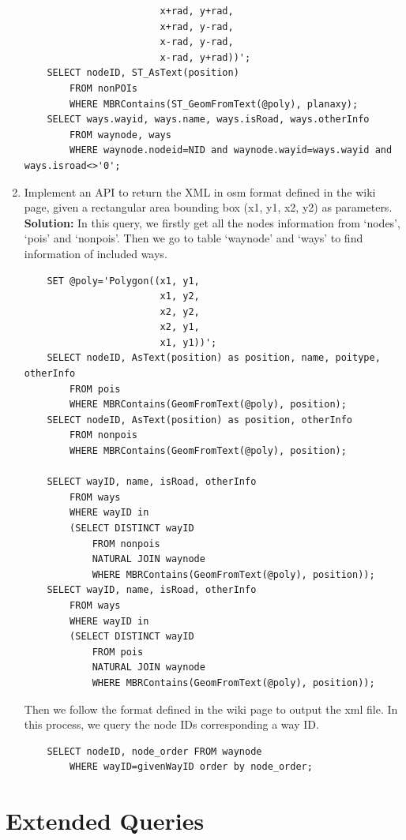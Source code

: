 \documentclass[final,1p,times]{elsarticle}
\begin{document}
\begin{enumerate}
\begin{verbatim}
                        x+rad, y+rad, 
                        x+rad, y-rad, 
                        x-rad, y-rad, 
                        x-rad, y+rad))';
    SELECT nodeID, ST_AsText(position)
        FROM nonPOIs
        WHERE MBRContains(ST_GeomFromText(@poly), planaxy);
    SELECT ways.wayid, ways.name, ways.isRoad, ways.otherInfo
        FROM waynode, ways
        WHERE waynode.nodeid=NID and waynode.wayid=ways.wayid and ways.isroad<>'0';
  \end{verbatim}
  \item Implement an API to return the XML in osm format defined in the wiki page, given a rectangular area bounding box (x1, y1, x2, y2) as parameters.\\
  \textbf{Solution:} In this query, we firstly get all the nodes information from `nodes', `pois' and `nonpois'. Then we go to table `waynode' and `ways' to find information of included ways.
  \begin{verbatim}
    SET @poly='Polygon((x1, y1, 
                        x1, y2, 
                        x2, y2, 
                        x2, y1, 
                        x1, y1))';
    SELECT nodeID, AsText(position) as position, name, poitype, otherInfo 
        FROM pois 
        WHERE MBRContains(GeomFromText(@poly), position);
    SELECT nodeID, AsText(position) as position, otherInfo 
        FROM nonpois 
        WHERE MBRContains(GeomFromText(@poly), position);

    SELECT wayID, name, isRoad, otherInfo 
        FROM ways 
        WHERE wayID in 
        (SELECT DISTINCT wayID 
            FROM nonpois 
            NATURAL JOIN waynode 
            WHERE MBRContains(GeomFromText(@poly), position));
    SELECT wayID, name, isRoad, otherInfo
        FROM ways
        WHERE wayID in 
        (SELECT DISTINCT wayID 
            FROM pois 
            NATURAL JOIN waynode 
            WHERE MBRContains(GeomFromText(@poly), position));
  \end{verbatim}
  Then we follow the format defined in the wiki page to output the xml file. In this process, we query the node IDs corresponding a way ID.
  \begin{verbatim}
    SELECT nodeID, node_order FROM waynode
        WHERE wayID=givenWayID order by node_order;
  \end{verbatim}
\end{enumerate}
\section{Extended Queries}
\end{document}
